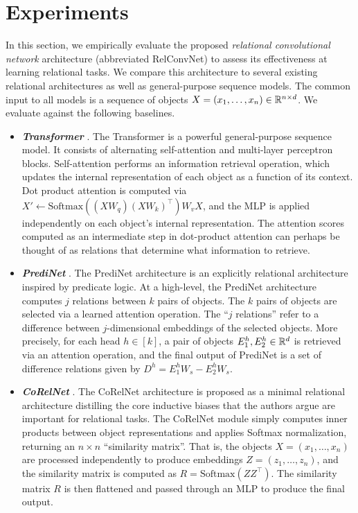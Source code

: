 \section{Experiments}\label{sec:experiments}

In this section, we empirically evaluate the proposed \textit{relational convolutional network} architecture (abbreviated RelConvNet) to assess its effectiveness at learning relational tasks. We compare this architecture to several existing relational architectures as well as general-purpose sequence models. The common input to all models is a sequence of objects $X = (x_1, \ldots, x_n) \in \mathbb{R}^{n \times d}$. We evaluate against the following baselines.
\begin{itemize}
    \item \textbf{\textit{Transformer}} \citep{vaswani2017attention}. The Transformer is a powerful general-purpose sequence model. It consists of alternating self-attention and multi-layer perceptron blocks. Self-attention performs an information retrieval operation, which updates the internal representation of each object as a function of its context.
    Dot product attention is computed via $X' \gets \mathrm{Softmax}((X W_q) (X W_k)^{\intercal}) W_v X$, and the MLP is applied independently on each object's internal representation.
    The attention scores computed as an intermediate step in dot-product attention can perhaps be thought of as relations that determine what information to retrieve.
    \item \textbf{\textit{PrediNet}} \citep{shanahanExplicitlyRelationalNeural}. The PrediNet architecture is an explicitly relational architecture inspired by predicate logic. At a high-level, the PrediNet architecture computes $j$ relations between $k$ pairs of objects. The $k$ pairs of objects are selected via a learned attention operation. The ``$j$ relations'' refer to a difference between $j$-dimensional embeddings of the selected objects. More precisely, for each head $h \in [k]$, a pair of objects $E_1^h, E_2^h \in \mathbb{R}^d$ is retrieved via an attention operation, and the final output of PrediNet is a set of difference relations given by $D^h = E_1^h W_s - E_2^h W_s$.
    \item \textbf{\textit{CoRelNet}} \citep{kergNeuralArchitecture2022}. The CoRelNet architecture is proposed as a minimal relational architecture distilling the core inductive biases that the authors argue are important for relational tasks. The CoRelNet module simply computes inner products between object representations and applies Softmax normalization, returning an $n \times n$ ``similarity matrix''. That is, the objects $X = (x_1, \ldots, x_n)$ are processed independently to produce embeddings $Z = (z_1, \ldots, z_n)$, and the similarity matrix is computed as $R = \mathrm{Softmax}(Z Z^\intercal)$. The similarity matrix $R$ is then flattened and passed through an MLP to produce the final output.

\end{itemize}
